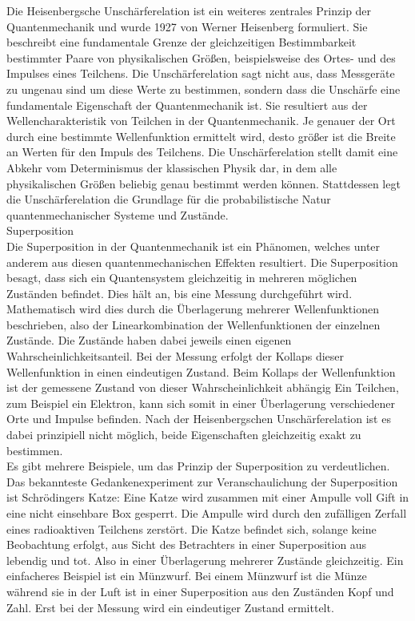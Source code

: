 Die Heisenbergsche Unschärferelation ist ein weiteres zentrales Prinzip der Quantenmechanik und wurde 1927 von Werner Heisenberg formuliert. Sie beschreibt eine fundamentale Grenze der gleichzeitigen Bestimmbarkeit bestimmter Paare von physikalischen Größen, beispielsweise des Ortes- und des Impulses eines Teilchens. Die Unschärferelation sagt nicht aus, dass Messgeräte zu ungenau sind um diese Werte zu bestimmen, sondern dass die Unschärfe eine fundamentale Eigenschaft der Quantenmechanik ist. Sie resultiert aus der Wellencharakteristik von Teilchen in der Quantenmechanik. Je genauer der Ort durch eine bestimmte Wellenfunktion ermittelt wird, desto größer ist die Breite an Werten für den Impuls des Teilchens. Die Unschärferelation stellt damit eine Abkehr vom Determinismus der klassischen Physik dar, in dem alle physikalischen Größen beliebig genau bestimmt werden können. Stattdessen legt die Unschärferelation die Grundlage für die probabilistische Natur quantenmechanischer Systeme und Zustände. \\

Superposition\\

Die Superposition in der Quantenmechanik ist ein Phänomen, welches unter anderem aus diesen quantenmechanischen Effekten resultiert. Die Superposition besagt, dass sich ein Quantensystem gleichzeitig in mehreren möglichen Zuständen befindet. Dies hält an, bis eine Messung durchgeführt wird. Mathematisch wird dies durch die Überlagerung mehrerer Wellenfunktionen beschrieben, also der Linearkombination der Wellenfunktionen der einzelnen Zustände. Die Zustände haben dabei jeweils einen eigenen Wahrscheinlichkeitsanteil.
Bei der Messung erfolgt der Kollaps dieser Wellenfunktion in einen eindeutigen Zustand. Beim Kollaps der Wellenfunktion ist der gemessene Zustand von dieser Wahrscheinlichkeit abhängig Ein Teilchen, zum Beispiel ein Elektron, kann sich somit in einer Überlagerung verschiedener Orte und Impulse befinden. Nach der Heisenbergschen Unschärferelation ist es dabei prinzipiell nicht möglich, beide Eigenschaften gleichzeitig exakt zu bestimmen.\\

Es gibt mehrere Beispiele, um das Prinzip der Superposition zu verdeutlichen. Das bekannteste Gedankenexperiment zur Veranschaulichung der Superposition ist Schrödingers Katze: Eine Katze wird zusammen mit einer Ampulle voll Gift  in eine nicht einsehbare Box gesperrt. Die Ampulle wird durch den zufälligen Zerfall eines radioaktiven Teilchens zerstört. Die Katze befindet sich, solange keine Beobachtung erfolgt, aus Sicht des Betrachters in einer Superposition aus lebendig und tot. Also in einer Überlagerung mehrerer Zustände gleichzeitig. Ein einfacheres Beispiel ist ein Münzwurf. Bei einem Münzwurf ist die Münze während sie in der Luft ist in einer Superposition aus den Zuständen Kopf und Zahl. Erst bei der Messung wird ein eindeutiger Zustand ermittelt.\\

